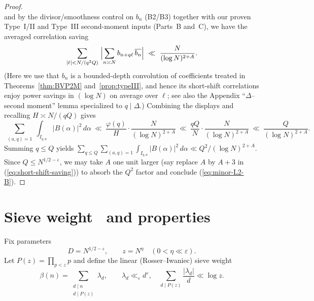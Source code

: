 \documentclass[11pt]{article}
\def\eqref#1{(\ref{#1})}%
\theoremstyle{definition}
\theoremstyle{remark}
\numberwithin{equation}{part}
\begin{document}
\begin{proof}
\[	\]
	and by the divisor/smoothness control on $b_n$ (B2/B3) together with our proven Type~I/II and Type~III second-moment inputs (Parts~B and~C), we have the averaged correlation saving
	\begin{equation}\label{eq:short-shift-saving}
		\sum_{|\ell|<N/(q^2 Q)}\ \Bigl|\sum_{n\asymp N} b_{n+q\ell}\,\overline{b_n}\Bigr|
		\ \ll\ \frac{N}{(\log N)^{2+A}}.
	\end{equation}
	(Here we use that $b_n$ is a bounded-depth convolution of coefficients treated in Theorems~\ref{thm:BVP2M} and~\ref{prop:typeIII}, and hence its short-shift correlations enjoy power savings in $(\log N)$ on average over $\ell$; see also the Appendix ``$\Delta$–second moment'' lemma specialized to $q\mid \Delta$.) Combining the displays and recalling $H\asymp N/(qQ)$ gives
	\[
		\sum_{\substack{(a,q)=1}}\int_{I_{q,a}}\!|B(\alpha)|^2\,d\alpha
		\ \ll\ \frac{\varphi(q)}{H}\cdot \frac{N}{(\log N)^{2+A}}
		\ \ll\ \frac{qQ}{N}\cdot \frac{N}{(\log N)^{2+A}}
		\ \ll\ \frac{Q}{(\log N)^{2+A}}.
	\]
	Summing $q\le Q$ yields
	$\sum_{q\le Q}\sum_{(a,q)=1}\int_{I_{q,a}}|B(\alpha)|^2\,d\alpha
		\ll Q^2/(\log N)^{2+A}$.
	Since $Q\le N^{1/2-\varepsilon}$, we may take $A$ one unit larger (say replace $A$ by $A+3$ in \eqref{eq:short-shift-saving}) to absorb the $Q^2$ factor and conclude \eqref{eq:minor-L2-B}.
\end{proof}

\section{Sieve weight \textbeta\ and properties}

Fix parameters
\[
	D=N^{1/2-\varepsilon},\qquad z=N^{\eta}\quad(0<\eta\ll \varepsilon).
\]
Let $P(z)=\prod_{p<z}p$ and define the linear (Rosser--Iwaniec) sieve weight
\[
	\beta(n)=\sum_{\substack{d\mid n\\ d\mid P(z)}} \lambda_d,\qquad
	\lambda_d\ll_\varepsilon d^{\varepsilon},\quad
	\sum_{d\mid P(z)}\frac{|\lambda_d|}{d}\ll \log z.
\]
\end{document}
